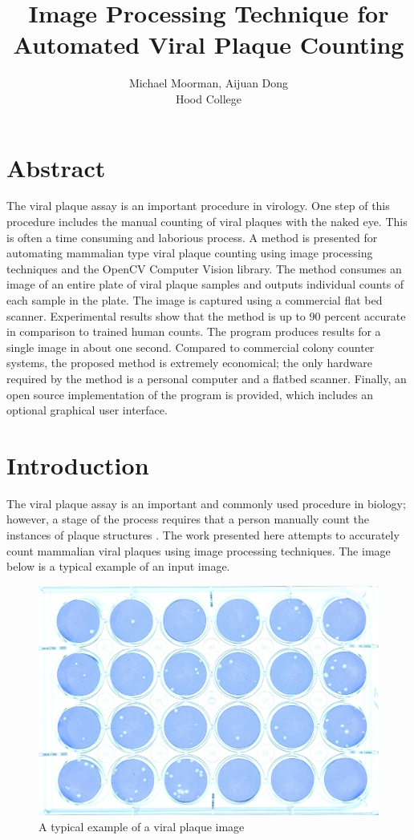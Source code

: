 \documentclass[11pt,final,twocolumn]{IEEEtran}
\begin{document}
\title{Image Processing Technique for Automated Viral Plaque Counting}
\author{Michael Moorman, Aijuan Dong \\
Hood College}
\maketitle
\section{Abstract}
The viral plaque assay is an important procedure in virology. One step of this procedure includes the manual counting of viral plaques with the naked eye.  This is often a time consuming and laborious process. A method is presented for automating mammalian type viral plaque counting using image processing techniques and the OpenCV Computer Vision library. The method consumes an image of an entire plate of viral plaque samples and outputs individual counts of each sample in the plate. The image is captured using a commercial flat bed scanner. Experimental results show that the method is up to 90 percent accurate in comparison to trained human counts. The program produces results for a single image in about one second.  Compared to commercial colony counter systems, the proposed method is extremely economical; the only hardware required by the method is a personal computer and a flatbed scanner.  Finally, an open source implementation of the program is provided, which includes an optional graphical user interface. 


\section{Introduction}
The viral plaque assay is an important and commonly used procedure in biology; however, a stage of the process requires that a person manually count the instances of plaque structures . The work presented here attempts to accurately count mammalian  viral plaques using image processing techniques. The image below is a typical example of an input image.
\begin{figure}[h]
\centering
\includegraphics[width=.4\textwidth]{sample.jpg}
\caption{A typical example of a viral plaque image}
\label{fig:sample}
\end{figure}
\end{document}
